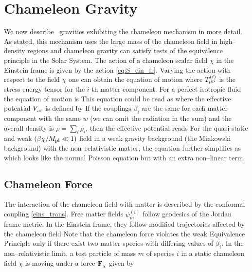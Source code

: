 \section{Chameleon Gravity}
\label{sec_cham}
We now describe \fR\ gravities exhibiting the chameleon mechanism in more detail. As stated, this mechanism uses the large mass of the chameleon field in high--density regions and chameleon gravity can satisfy tests of the equivalence principle in the Solar System. The action of a chameleon scalar field $\chi$ in the Einstein frame is given by the action \eqref{eq:S_ein_fr}. Varying the action with respect to the field $\chi$ one can obtain the equation of motion
where $T^{(i)}_{\mu\nu}$ is the stress-energy tensor for the $i$-th matter component. For a perfect isotropic fluid the equation of motion is
This equation could be read as
where the effective potential $V_{_\text{\tiny eff}}$ is defined by
If the couplings $\beta_i$ are the same for each matter component with the same $w$ (we can omit the radiation in the sum) and the overall density is $\rho=\sum_i\rho_i$, then the effective potential reads
For the quasi-static and weak $(\beta\chi/M_{\text{\scriptsize pl}}\ll1)$ field in a weak gravity background (the Minkowski background) with the non--relativistic matter, the equation further simplifies as
which looks like the normal Poisson equation but with an extra non--linear term.
\subsection{Chameleon Force}
The interaction of the chameleon field with matter is described by the conformal coupling \eqref{eins_trans}. Free matter fields $\psi_m^{(i)}$ follow geodesics of the Jordan frame metric. In the Einstein frame, they follow modified trajectories affected by the chameleon field \parencite{Waterhouse:2006wv}
Note that the chameleon force violates the weak Equivalence Principle only if there exist two matter species with differing values of $\beta_i$. In the non--relativistic limit, a test particle of mass $m$ of species $i$ in a static chameleon field $\chi$ is moving under a force $\mathbf{F}_\chi$ given by
